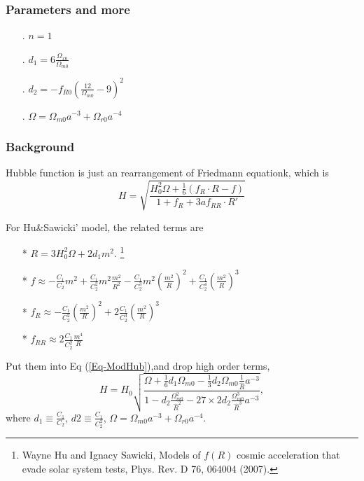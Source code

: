 \documentclass[12pt,a4paper]{article}
\begin{document}
\subsubsection{Parameters and more}
\begin{itemize}
\item[.]
$n=1$
\item[.]
$d_1=6\frac{\Omega_{x0}}{\Omega_{m0}}$
\item[.]
$d_2=-f_{R0}\left( \frac{12}{\Omega_{m0}}-9 \right)^2$
\item[.]
$\Omega=\Omega_{m0}a^{-3}+\Omega_{r0}a^{-4}$
\end{itemize}

\subsubsection{Background}


Hubble function is just an rearrangement of Friedmann equationk, which is
\begin{equation}
H=\sqrt{\frac{H_0^2\Omega+\frac{1}{6}(f_R\cdot R-f)}{1+f_R+3a f_{RR}\cdot R'}}\label{Eq-ModHub}
\end{equation}

For Hu\&Sawicki' model, the related terms are
\begin{enumerate}
\item[*]
$R=3H_0^2\Omega+2d_1 m^2$. \qquad\footnote{Wayne Hu and Ignacy Sawicki, Models of $f(R)$ cosmic acceleration that evade solar system tests, Phys. Rev. D 76, 064004 (2007).}
\item[*]
$f\approx -\frac{C_1}{C_2}m^2+\frac{C_1}{C_2^2} m^2\frac{m^2}{R^2}-\frac{C_1}{C_2^3}m^2(\frac{m^2}{R})^2+\frac{C_1}{C_2^4}(\frac{m^2}{R})^3$
\item[*]
$f_R\approx -\frac{C_1}{C_2^2}(\frac{m^2}{R})^2+2\frac{C_1}{C_2^3}(\frac{m^2}{R})^3$
\item[*]
$f_{RR}\approx 2\frac{C_1}{C_2^2}\frac{m^4}{R}$
\end{enumerate}

Put them into Eq (\ref{Eq-ModHub}),and drop high order terms,
\begin{equation}
H=H_0\sqrt{\frac{\Omega+\frac16 d_1 \Omega_{m0}-\frac13 d_2 \Omega_{m0}\frac{1}{\hat R}a^{-3}}{1-d_2\frac{\Omega_{m0}^2}{\hat R^2}-27\times 2 d_2 \frac{\Omega_{m0}^3}{\hat R^3}a^{-3}}},
\end{equation}
where $d_1\equiv \frac{C_1}{C_2}$, $d2\equiv \frac{C_1}{C_2^2}$, $\Omega= \Omega_{m0}a^{-3}+\Omega_{r0}a^{-4}$.
\end{document}
